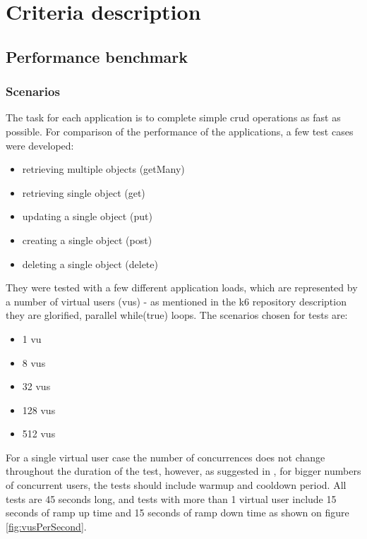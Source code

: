 
\chapter{Criteria description}

\section{Performance benchmark}

\subsection{Scenarios}
The task for each application is to complete simple \acrshort{crud} operations as fast as possible. For comparison of the performance of the applications, a few test cases were developed:

\begin{itemize}
    \item retrieving multiple objects (getMany)
    \item retrieving single object (get)
    \item updating a single object (put)
    \item creating a single object (post)
    \item deleting a single object (delete)
\end{itemize}

They were tested with a few different application loads, which are represented by a number of virtual users (\acrshort{vu}s) - as mentioned in the k6 repository description they are glorified, parallel while(true) loops.
The scenarios chosen for tests are:
\begin{itemize}
    \item 1 \acrshort{vu}
    \item 8 \acrshort{vu}s
    \item 32 \acrshort{vu}s
    \item 128 \acrshort{vu}s
    \item 512 \acrshort{vu}s
\end{itemize}
For a single virtual user case the number of concurrences does not change throughout the duration of the test, however, as suggested in
, for bigger numbers of concurrent users, the tests should include warmup and cooldown period. All tests are 45 seconds long, and tests with more than 1 virtual user include 15 seconds of ramp up time and 15 seconds of ramp down time as shown on figure \ref{fig:vusPerSecond}.

